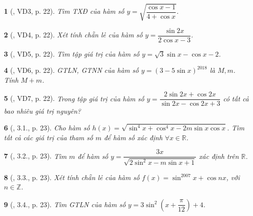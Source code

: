 \documentclass{article}
\newtheorem{baitoan}{}
\begin{document}
\begin{baitoan}[\cite{Hung_nang_cao_phat_trien_Toan_11_tap_1}, VD3, p. 22]
	Tìm {\rm TXĐ} của hàm số $y = \sqrt{\dfrac{\cos x - 1}{4 + \cos x}}$.
\end{baitoan}

\begin{baitoan}[\cite{Hung_nang_cao_phat_trien_Toan_11_tap_1}, VD4, p. 22]
	Xét tính chẵn lẻ của hàm số $y = \dfrac{\sin2x}{2\cos x - 3}$.
\end{baitoan}

\begin{baitoan}[\cite{Hung_nang_cao_phat_trien_Toan_11_tap_1}, VD5, p. 22]
	Tìm tập giá trị của hàm số $y = \sqrt{3}\sin x - \cos x - 2$.
\end{baitoan}

\begin{baitoan}[\cite{Hung_nang_cao_phat_trien_Toan_11_tap_1}, VD6, p. 22]
	{\rm GTLN, GTNN} của hàm số $y = (3 - 5\sin x)^{2018}$ là $M,m$. Tính $M + m$.
\end{baitoan}

\begin{baitoan}[\cite{Hung_nang_cao_phat_trien_Toan_11_tap_1}, VD7, p. 22]
	Trong tập giá trị của hàm số $y = \dfrac{2\sin2x + \cos2x}{\sin2x - \cos2x + 3}$ có tất cả bao nhiêu giá trị nguyên?
\end{baitoan}

\begin{baitoan}[\cite{Hung_nang_cao_phat_trien_Toan_11_tap_1}, 3.1., p. 23]
	Cho hàm số $h(x) = \sqrt{\sin^4x + \cos^4x - 2m\sin x\cos x}$. Tìm tất cả các giá trị của tham số $m$ để hàm số xác định $\forall x\in\mathbb{R}$.
\end{baitoan}

\begin{baitoan}[\cite{Hung_nang_cao_phat_trien_Toan_11_tap_1}, 3.2., p. 23]
	Tìm $m$ để hàm số $y = \dfrac{3x}{\sqrt{2\sin^2x - m\sin x + 1}}$ xác định trên $\mathbb{R}$.
\end{baitoan}

\begin{baitoan}[\cite{Hung_nang_cao_phat_trien_Toan_11_tap_1}, 3.3., p. 23]
	Xét tính chẵn lẻ của hàm số $f(x) = \sin^{2007}x + \cos nx$, với $n\in\mathbb{Z}$.
\end{baitoan}

\begin{baitoan}[\cite{Hung_nang_cao_phat_trien_Toan_11_tap_1}, 3.4., p. 23]
	Tìm {\rm GTLN} của hàm số $y = 3\sin^2\left(x + \dfrac{\pi}{12}\right) + 4$.
\end{baitoan}
\end{document}
